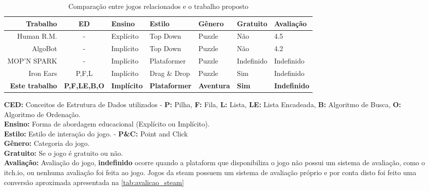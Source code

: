 \begin{table}[H]
	\caption{Comparação entre jogos relacionados e o trabalho proposto}
	\label{tab:cmp_jogos_relatos}
	\centering
	\footnotesize
	\begin{tabular}{r|clllll}
		\toprule
		\textbf{Trabalho}      & \textbf{ED}         & \textbf{Ensino}    & \textbf{Estilo}      & \textbf{Gênero}   & \textbf{Gratuito} & \textbf{Avaliação}  \\
		\midrule
		Human R.M.             & -                   & Explícito          & Top Down             & Puzzle            & Não               & 4.5                 \\
		AlgoBot                & -                   & Implícito          & Top Down             & Puzzle            & Não               & 4.2                 \\
		MOP'N SPARK            & -                   & Implícito          & Plataformer          & Puzzle            & Indefinido        & Indefinido          \\
		Iron Ears              & P,F,L               & Implícito          & Drag \& Drop         & Puzzle            & Sim               & Indefinido          \\
		\rowcolor{headergray}
		\textbf{Este trabalho} & \textbf{P,F,LE,B,O} & \textbf{Implícito} & \textbf{Plataformer} & \textbf{Aventura} & \textbf{Sim}      & \textbf{Indefinido} \\
		\bottomrule
	\end{tabular}

	\vspace{1.25em}
	\begin{minipage}{0.8\linewidth}
		\footnotesize
		\textbf{CED:} Conceitos de Estrutura de Dados utilizados -
		\textbf{P:} Pilha, \textbf{F:} Fila, \textbf{L:} Lista, \textbf{LE:} Lista Encadeada, \textbf{B:} Algoritmo de Busca, \textbf{O:} Algoritmo de Ordenação. \\
		\textbf{Ensino:} Forma de abordagem educacional (Explícito ou Implícito). \\
		\textbf{Estilo:} Estilo de interação do jogo. - \textbf{P\&C:} Point and Click \\
		\textbf{Gênero:} Categoria do jogo. \\
		\textbf{Gratuito:} Se o jogo é gratuito ou não. \\
		\textbf{Avaliação:} Avaliação do jogo, \textbf{indefinido} ocorre quando a plataform que disponibiliza o jogo não possui um sistema de avaliação, como o itch.io, ou nenhuma avaliação foi feita ao jogo. Jogos da steam possuem um sistema de avaliação próprio e por conta disto foi feito uma conversão aproximada apresentada na \autoref{tab:avalicao_steam}
	\end{minipage}
\end{table}
